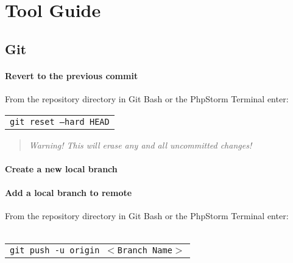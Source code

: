
\chapter{Tool Guide}

\section{Git}

\subsubsection{Revert to the previous commit}
From the repository directory in Git Bash or the PhpStorm Terminal enter:\\

\begin{tabular}{l}
	\texttt{git reset --hard HEAD}\\
\end{tabular}

\begin{quote}
	\emph{Warning! This will erase any and all uncommitted changes!}
\end{quote}

\subsubsection{Create a new local branch}

\subsubsection{Add a local branch to remote}
From the repository directory in Git Bash or the PhpStorm Terminal enter:\\
\\
\begin{tabular}{l}
	\texttt{git push -u origin $<$Branch Name$>$}
\end{tabular}
\newpage
